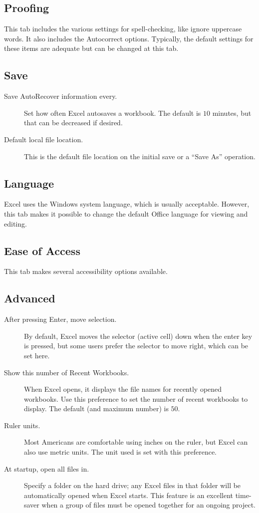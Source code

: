 \subsection{Proofing}

This tab includes the various settings for spell-checking, like ignore uppercase words. It also includes the Autocorrect options. Typically, the default settings for these items are adequate but can be changed at this tab.

\subsection{Save}

\begin{description}
	\item[Save AutoRecover information every.] Set how often Excel autosaves a workbook. The default is $ 10 $ minutes, but that can be decreased if desired.
	\item[Default local file location.] This is the default file location on the initial save or a ``Save As'' operation.
\end{description}

\subsection{Language}

Excel uses the Windows system language, which is usually acceptable. However, this tab makes it possible to change the default Office language for viewing and editing.

\subsection{Ease of Access}

This tab makes several accessibility options available. 

\subsection{Advanced}
	
	\begin{description}
		\item[After pressing Enter, move selection.] By default, Excel moves the selector (active cell) down when the enter key is pressed, but some users prefer the selector to move right, which can be set here.
		\item[Show this number of Recent Workbooks.] When Excel opens, it displays the file names for recently opened workbooks. Use this preference to set the number of recent workbooks to display. The default (and maximum number) is $ 50 $.
		\item[Ruler units.] Most Americans are comfortable using inches on the ruler, but Excel can also use metric units. The unit used is set with this preference.
		\item[At startup, open all files in.] Specify a folder on the hard drive; any Excel files in that folder will be automatically opened when Excel starts. This feature is an excellent time-saver when a group of files must be opened together for an ongoing project.
	\end{description}
	

